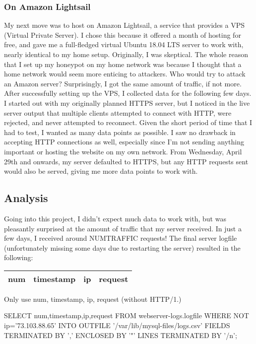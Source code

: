 \documentclass[12pt]{article}
\begin{document}
\subsubsection{On Amazon Lightsail}
My next move was to host on Amazon Lightsail, a service that provides a VPS (Virtual Private Server).
I chose this because it offered a month of hosting for free, and gave me a full-fledged virtual Ubuntu 18.04 LTS server to work with, nearly identical to my home setup.
Originally, I was skeptical.
The whole reason that I set up my honeypot on my home network was because I thought that a home network would seem more enticing to attackers.
Who would try to attack an Amazon server?
Surprisingly, I got the same amount of traffic, if not more.
After successfully setting up the VPS, I collected data for the following few days.
I started out with my originally planned HTTPS server, but I noticed in the live server output that multiple clients attempted to connect with HTTP, were rejected, and never attempted to reconnect.
Given the short period of time that I had to test, I wanted as many data points as possible.
I saw no drawback in accepting HTTP connections as well, especially since I'm not sending anything important or hosting the website on my own network.
From Wednesday, April 29th and onwards, my server defaulted to HTTPS, but any HTTP requests sent would also be served, giving me more data points to work with.


\subsection{Analysis}
Going into this project, I didn't expect much data to work with, but was pleasantly surprised at the amount of traffic that my server received.
In just a few days, I received around NUMTRAFFIC requests!
The final server logfile (unfortunately missing some days due to restarting the server) resulted in the following:

\renewcommand{\arraystretch}{0.6}
\footnotesize
{}
\begin{longtable}{|l|l|l|l|}
\hline
\textbf{num} & \textbf{timestamp} & \textbf{ip} & \textbf{request} \\ \hline
\end{longtable}
\restoregeometry
\normalsize

Only use num, timestamp, ip, request (without HTTP/1.)

SELECT num,timestamp,ip,request
FROM webserver-logs.logfile
WHERE NOT ip='73.103.88.65'
INTO OUTFILE '/var/lib/mysql-files/logs.csv'
FIELDS TERMINATED BY ','
ENCLOSED BY '"'
LINES TERMINATED BY '/n';
\end{document}
